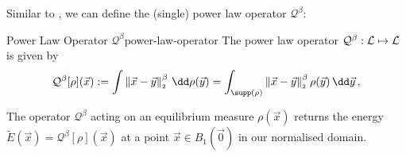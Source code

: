 Similar to , we can define the (single) power law operator $\mathcal{Q}^\beta$:

\begin{definition}{Power Law Operator $\mathcal{Q}^\beta$}{power-law-operator}
  The power law operator $\mathcal{Q}^\beta: \mathcal{L} \mapsto \mathcal{L}$ is given by
  $$\mathcal{Q}^\beta[\rho](\vec{x}) := \int \norm{\vec{x}-\vec{y}}^\beta \,\dd\rho(\vec{y}) = \int_{\supp(\rho)} \norm{\vec{x}-\vec{y}}^\beta \rho(\vec{y}) \,\dd\vec{y}\,,$$
\end{definition}

The operator $\mathcal{Q}^\beta$ acting on an equilibrium measure $\rho(\vec{x})$ returns the energy $\tilde{E}(\vec{x}) = \mathcal{Q}^\beta[\rho](\vec{x})$ at a point $\vec{x} \in B_1(\vec{0})$ in our normalised domain.
